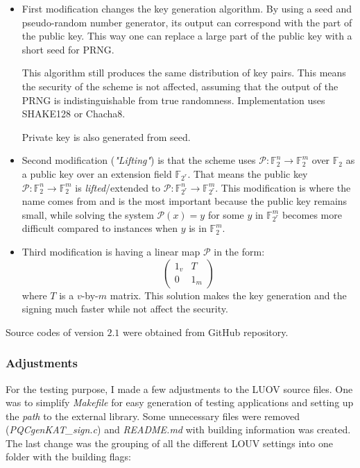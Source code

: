 \documentclass[thesis=M,english]{FITthesis}[2019/12/23]
\begin{document}
\begin{itemize}
\item	First modification changes the key generation algorithm. By using a seed and pseudo-random number generator, its output can correspond with the part of the public key. This way one can replace a large part of the public key with a short seed for PRNG.

This algorithm still produces the same distribution of key pairs. This means the security of the scheme is not affected, assuming that the output of the PRNG is indistinguishable from true randomness. Implementation uses SHAKE128 or Chacha8.

Private key is also generated from seed.

\item	Second modification (\textit{"Lifting"}) is that the scheme uses $\mathcal{P}:\mathbb{F}_2^n \rightarrow \mathbb{F}_2^m$ over $\mathbb{F}_2$ as a public key over an extension field $\mathbb{F}_{2^r}$. That means the public key $\mathcal{P}:\mathbb{F}_2^n \rightarrow \mathbb{F}_2^m$ is \textit{lifted}/extended to $\mathcal{P}:\mathbb{F}_{2^r}^n \rightarrow \mathbb{F}_{2^r}^m$. This modification is where the name comes from and is the most important because the public key remains small, while solving the system $\mathcal{P}(x) = y$ for some $y$ in $\mathbb{F}_{2^r}^m$ becomes more difficult compared to instances when $y$ is in $\mathbb{F}_{2}^m$.\cite{L-LIFTING}

\item	Third modification is having a linear map $\mathcal{P}$ in the form:
\begin{equation*}
\begin{pmatrix}
1_v & T\\
0 & 1_m
\end{pmatrix}
\end{equation*}
where $T$ is a $v$-by-$m$ matrix. This solution makes the key generation and the signing much faster\cite{L-CZYP} while not affect the security.\cite{L-EQ-KEYS}
\end{itemize}

Source codes of version $2.1$ were obtained from GitHub repository.

\subsubsection{Adjustments}
For the testing purpose, I made a few adjustments to the LUOV source files. One was to simplify \textit{Makefile} for easy generation of testing applications and setting up the \textit{path} to the external library. Some unnecessary files were removed (\textit{PQCgenKAT\_sign.c}) and \textit{README.md} with building information was created. The last change was the grouping of all the different LOUV settings into one folder with the building flags:
\end{document}
